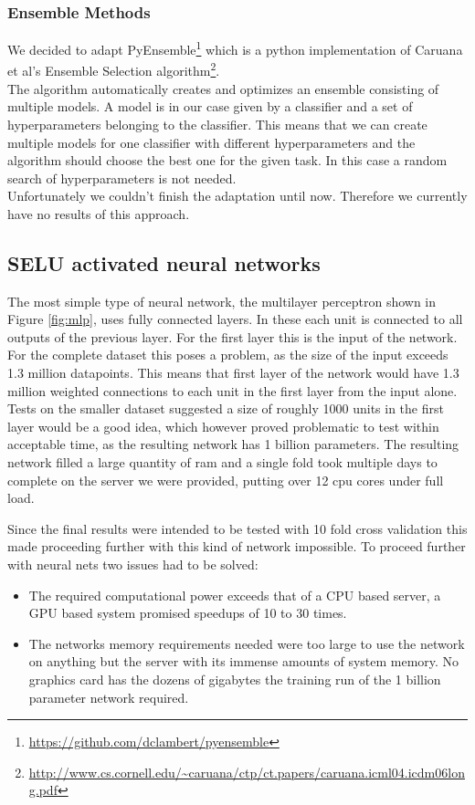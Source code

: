 \documentclass{article}
\begin{document}
\subsubsection*{Ensemble Methods}
We decided to adapt PyEnsemble\footnote{\url{https://github.com/dclambert/pyensemble}}
which is a python implementation of Caruana et al's Ensemble Selection
algorithm\footnote{\url{http://www.cs.cornell.edu/~caruana/ctp/ct.papers/caruana.icml04.icdm06long.pdf}}.
\\
The algorithm automatically creates and optimizes an ensemble consisting of
multiple models. A model is in our case given by a classifier and a set of
hyperparameters belonging to the classifier. This means that we can create
multiple models for one classifier with different hyperparameters and the
algorithm should choose the best one for the given task. In this case a random
search of hyperparameters is not needed. \\
Unfortunately we couldn't finish the adaptation until now. Therefore we
currently have no results of this approach.

\subsection*{SELU activated neural networks}

The most simple type of neural network, the multilayer perceptron shown in Figure \ref{fig:mlp}, uses fully connected layers. In these each unit is connected to all outputs of the previous layer. For the first layer this is the 
input of the network. For the complete dataset this poses a problem, as the size of the input exceeds 1.3 million datapoints. This means that first layer of the network would have 1.3 million weighted connections to each 
unit in the first layer from the input alone. Tests on the smaller dataset suggested a size of roughly 1000 units in the first layer would be a good idea, which however proved problematic to test within acceptable time, as 
the resulting network has 1 billion parameters. The resulting network filled a large quantity of ram and a single fold took multiple days to complete on the server we were provided, 
putting over 12 cpu cores under full load.

Since the final results were intended to be tested with 10 fold cross validation this made proceeding further with this kind of network impossible. To proceed further with neural nets two issues had to be solved:

\begin{itemize}
 \item The required computational power exceeds that of a CPU based server, a GPU based system promised speedups of 10 to 30 times.
 \item The networks memory requirements needed were too large to use the network on anything but the server with its immense amounts of system memory. No graphics card has the dozens of gigabytes the training run of the 1
 billion parameter network required.
\end{itemize}
\end{document}
